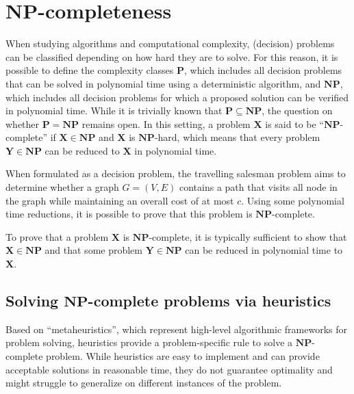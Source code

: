 \documentclass{report}
\begin{document}
\section{$\mathbf{NP}$-completeness}
When studying algorithms and computational complexity, (decision) problems can be classified depending on how hard they are to solve. \newline
For this reason, it is possible to define the complexity classes $\displaystyle \mathbf{P}$, which includes all decision problems that can be solved in polynomial time using a deterministic algorithm, and $\displaystyle \mathbf{NP}$, which includes all decision problems for which a proposed solution can be verified in polynomial time. \newline
While it is trivially known that $\displaystyle \mathbf{P} \subseteq \mathbf{NP}$, the question on whether $\displaystyle \mathbf{P} = \mathbf{NP}$ remains open. \newline
In this setting, a problem $\displaystyle \mathbf{X}$ is said to be ``$\displaystyle \mathbf{NP}$-complete'' if $\displaystyle \mathbf{X} \in \mathbf{NP}$ and $\displaystyle \mathbf{X}$ is $\displaystyle \mathbf{NP}$-hard, which means that every problem $\displaystyle \mathbf{Y} \in \mathbf{NP}$ can be reduced to $\displaystyle \mathbf{X}$ in polynomial time.
\begin{examplebox}
    When formulated as a decision problem, the travelling salesman problem aims to determine whether a graph $\displaystyle G = (V, E)$ contains a path that visits all node in the graph while maintaining an overall cost of at most $\displaystyle c$. \newline
    Using some polynomial time reductions, it is possible to prove that this problem is $\displaystyle \mathbf{NP}$-complete.
\end{examplebox}
\noindent To prove that a problem $\displaystyle \mathbf{X}$ is $\displaystyle \mathbf{NP}$-complete, it is typically sufficient to show that $\displaystyle \mathbf{X} \in \mathbf{NP}$ and that some problem $\displaystyle \mathbf{Y} \in \mathbf{NP}$ can be reduced in polynomial time to $\displaystyle \mathbf{X}$.
\subsection{Solving $\mathbf{NP}$-complete problems via heuristics}
Based on ``metaheuristics'', which represent high-level algorithmic frameworks for problem solving, heuristics provide a problem-specific rule to solve a $\displaystyle \mathbf{NP}$-complete problem. \newline
While heuristics are easy to implement and can provide acceptable solutions in reasonable time, they do not guarantee optimality and might struggle to generalize on different instances of the problem.
\end{document}

